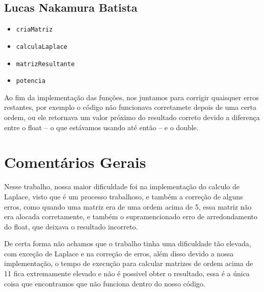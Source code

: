 \documentclass[12pt]{article}
\begin{document}
\subsection{Lucas Nakamura Batista}
\begin{itemize}
    \item \verb|criaMatriz|
    \item \verb|calculaLaplace|
    \item \verb|matrizResultante|
    \item \verb|potencia|
\end{itemize}

Ao fim da implementação das funções, nos juntamos para corrigir quaisquer erros 
restantes, por exemplo o código não funcionava corretamete depois de uma certa 
ordem, ou ele retornava um valor próximo do resultado correto devido a diferença 
entre o float -- o que estávamos usando até então -- e o double.

\section{Comentários Gerais}
Nesse trabalho, nossa maior dificuldade foi na implementação do calculo de Laplace, 
visto que é um processo trabalhoso, e também a correção de alguns erros, como 
quando uma matriz era de uma ordem acima de 5, essa matriz não era alocada 
corretamente, e também o supramencionado erro de arredondamento do float, que 
deixava o resultado incorreto. 

De certa forma não achamos que o trabalho tinha uma dificuldade tão elevada, 
com exceção de Laplace e na correção de erros, além disso devido a nossa 
implementação, o tempo de execução para calcular matrizes de ordem acima de 11 
fica extremamente elevado e não é possivel obter o resultado, essa é a única 
coisa que encontramos que não funciona dentro do nosso código.
\end{document}
